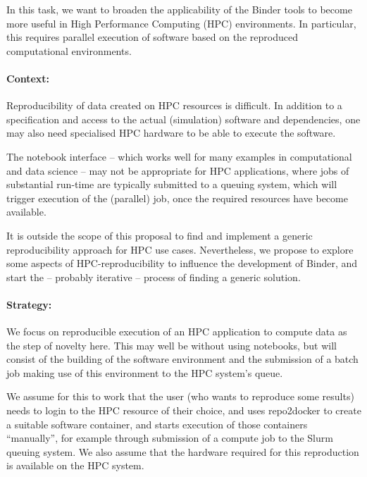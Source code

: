 \begin{task}[
  title=Binder at HPC facilities,
  id=binder-at-hpc,
  lead=MP,
  PM=17,
  partners={SRL,IFR,UIO}
]
In this task, we want to broaden the applicability of the Binder tools to become
more useful in High Performance Computing (HPC) environments. In particular, this
requires parallel execution of software based on the reproduced computational environments.

\paragraph*{Context:}
Reproducibility of data created on HPC resources is difficult. In addition to
a specification and access to the actual (simulation) software and dependencies,
one may also need specialised HPC hardware to be able to execute the software.

The notebook interface -- which works well for many examples in computational and
data science -- may not be appropriate for HPC applications, where jobs of
substantial run-time are typically submitted to a queuing system, which will
trigger execution of the (parallel) job, once the required resources have become
available.

It is outside the scope of this proposal to find and implement a generic
reproducibility approach for HPC use cases. Nevertheless, we propose to explore
some aspects of HPC-reproducibility to influence the development of Binder,
and start the -- probably iterative -- process of finding a generic solution.

\paragraph*{Strategy:}
We focus on reproducible execution of an HPC application to compute data as the step of
novelty here. This may well be without using notebooks, but will consist of the
building of the software environment and the submission of a batch job making use of this
environment to the HPC system's queue.

We assume for this to work that the user (who wants to reproduce some results)
needs to login to the HPC resource of their choice, and uses repo2docker to
create a suitable software container, and starts execution of those containers
``manually'', for example through submission of a compute job to the Slurm
queuing system. We also assume that the hardware required for this reproduction
is available on the HPC system.


\end{task}
